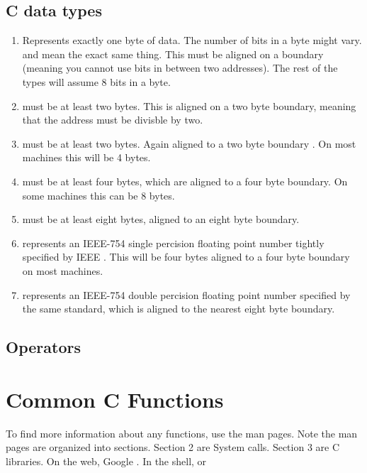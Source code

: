 \subsection{C data types}
\begin{enumerate}
\item {} Represents exactly one byte of data. The number of bits in a byte might vary.  and  mean the exact same thing. This must be aligned on a boundary (meaning you cannot use bits in between two addresses). The rest of the types will assume 8 bits in a byte.
\item {} must be at least two bytes. This is aligned on a two byte boundary, meaning that the address must be divisble by two.
\item {} must be at least two bytes. Again aligned to a two byte boundary \cite[P. 34]{ISON1124}. On most machines this will be 4 bytes.
\item {} must be at least four bytes, which are aligned to a four byte boundary. On some machines this can be 8 bytes.
\item {} must be at least eight bytes, aligned to an eight byte boundary.
\item {} represents an IEEE-754 single percision floating point number tightly specified by IEEE \cite{4610935}. This will be four bytes aligned to a four byte boundary on most machines.
\item {} represents an IEEE-754 double percision floating point number specified by the same standard, which is aligned to the nearest eight byte boundary.
\end{enumerate}

\subsection{Operators}

\section{Common C Functions}

To find more information about any functions, use the man pages. Note the man pages are organized into sections. Section 2 are System calls. Section 3 are C libraries. On the web, Google . In the shell,  or 

